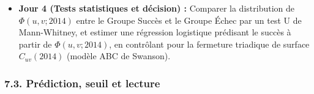 \documentclass[a4paper,11pt]{article}
\providecommand{\tightlist}{\setlength{\itemsep}{0pt}\setlength{\parskip}{0pt}}
\begin{document}
\begin{itemize}
  \begin{enumerate}
  \def\labelenumi{\arabic{enumi}.}
  \tightlist
  \item
    La distance de structure \(d_S(u,v;2014)\) via la distance d'édition
    d'arbres (\emph{Tree Edit Distance}, algorithme de Zhang-Shasha)
    entre les arbres d'opérateurs de \(u\) et de \(v\).
  \item
    Le score serrure-clé \(\Phi(u,v;2014)\) défini par la taille
    relative du plus grand sous-arbre d'opérateurs commun (\emph{Maximum
    Common Subtree}) entre \(\mathcal{N}_S(u,2014)\) et
    \(\mathcal{N}_S(v,2014)\), pénalisé si des opérateurs incompatibles
    (ex. opérateur linéaire vs non-linéaire au même nœud de dérivation)
    s'opposent (\(\chi\)).
  \end{enumerate}
\item
  \textbf{Jour 4 (Tests statistiques et décision) :} Comparer la
  distribution de \(\Phi(u,v;2014)\) entre le Groupe Succès et le Groupe
  Échec par un test U de Mann-Whitney, et estimer une régression
  logistique prédisant le succès à partir de \(\Phi(u,v;2014)\), en
  contrôlant pour la fermeture triadique de surface \(C_{uv}(2014)\)
  (modèle ABC de Swanson).
\end{itemize}

\subsubsection*{7.3. Prédiction, seuil et lecture}
\end{document}
